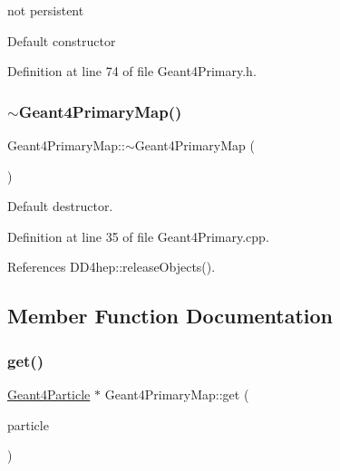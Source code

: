 not persistent 

Default constructor 

Definition at line 74 of file Geant4\+Primary.\+h.

\hypertarget{class_d_d4hep_1_1_simulation_1_1_geant4_primary_map_a7e013501b60e0d0516648405dcf7affd}{}\label{class_d_d4hep_1_1_simulation_1_1_geant4_primary_map_a7e013501b60e0d0516648405dcf7affd} 
\subsubsection{\texorpdfstring{$\sim$\+Geant4\+Primary\+Map()}{~Geant4PrimaryMap()}}
{\footnotesize\ttfamily Geant4\+Primary\+Map\+::$\sim$\+Geant4\+Primary\+Map (\begin{DoxyParamCaption}{ }\end{DoxyParamCaption})\hspace{0.3cm}{\ttfamily [virtual]}}



Default destructor. 



Definition at line 35 of file Geant4\+Primary.\+cpp.



References D\+D4hep\+::release\+Objects().



\subsection{Member Function Documentation}
\hypertarget{class_d_d4hep_1_1_simulation_1_1_geant4_primary_map_a4b4f4c2acc5258bdf1cc2b1c9aa735d9}{}\label{class_d_d4hep_1_1_simulation_1_1_geant4_primary_map_a4b4f4c2acc5258bdf1cc2b1c9aa735d9} 
\subsubsection{\texorpdfstring{get()}{get()}\hspace{0.1cm}{\footnotesize\ttfamily [1/2]}}
{\footnotesize\ttfamily \hyperlink{class_d_d4hep_1_1_simulation_1_1_geant4_particle}{Geant4\+Particle} $\ast$ Geant4\+Primary\+Map\+::get (\begin{DoxyParamCaption}\item[{const G4\+Primary\+Particle $\ast$}]{particle }\end{DoxyParamCaption})}



